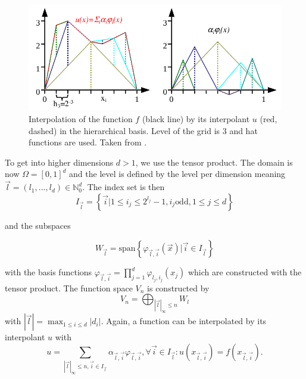 \begin{figure}[H]
	\centering
	\includegraphics[scale=0.5]{figures/weighted_sum_hierarchical.png}
	\caption{ Interpolation of the function $ f $ (black line) by its interpolant $ u $ (red, dashed) in the hierarchical basis. Level of the grid is 3 and hat functions are used. Taken from \cite{pfluger2010spatially}.}
	\label{fig:weighted_sum_hierarchical}
\end{figure}

To get into higher dimensions $ d > 1 $, we use the tensor product. The domain is now $ \Omega = [0,1]^d $ and the level is defined by the level per dimension meaning $ \vec{l} = (l_1, ..., l_d) \in \mathbb{N}_0^d $. The index set is then
\begin{equation}
	I_{\vec{l}} = \left\{ \vec{i} | 1 \le i_j \le 2^{l_j} -1 , i_j \text{odd}, 1 \le j \le d \right\}
\end{equation}

and the subspaces 

\begin{equation}
	W_{\vec{l}} = \text{span}\left\{ \varphi_{\vec{l},\vec{i}}( \vec{x} ) | \vec{i} \in I_{\vec{l}}\right\}
\end{equation}

with the basis functions $ \varphi_{\vec{l},\vec{i}} = \prod_{j=1}^{d} \varphi_{l_j,i_j}(x_j) $ which are constructed with the tensor product. The function space $ V_n $ is constructed by
\begin{equation}
	V_n = \bigoplus_{\left|\vec{l}\right|_\infty \le n} W_l
\end{equation}
with $ \left|\vec{l}\right| = \max_{1 \le i \le d} \left|d_i\right| $. Again, a function can be interpolated by its interpolant $ u $ with
\begin{equation}
	u = \sum_{\left|\vec{l}\right|_\infty \le n, \vec{i} \in I_{\vec{l}}}\alpha_{\vec{l},\vec{i}} \varphi_{\vec{l},\vec{i}}, \forall \vec{i} \in I_{\vec{l}}: u\left(x_{\vec{l},\vec{i}}\right) = f\left(x_{\vec{l},\vec{i}}\right).
\end{equation}

